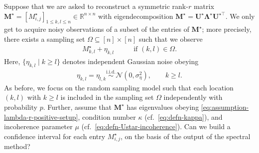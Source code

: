 Suppose that we are asked to reconstruct a symmetric rank-$r$ matrix
 $\bm{M}^{\star}=[M_{i,j}^{\star}]_{1\leq k,l \leq n}\in \mathbb{R}^{n\times n}$  
 with eigendecomposition $\bm{M}^{\star}=\bm{U}^{\star}\bm{\Lambda}^{\star}\bm{U}^{\star\top}$.
 We only get to acquire noisy observations of a subset of the entries of $\bm{M}^{\star}$; more precisely, 
there exists a sampling set $\Omega \subseteq [n]\times [n]$ such that we observe
%
\begin{align}
	M_{k,l}^{\star} + \eta_{k,l} \qquad & \text{if } (k,l)\in \Omega. 
\end{align}
%
Here, $\{\eta_{k,l}\mid k\geq l\}$ denotes independent Gaussian noise obeying  
%
\begin{align}
	\eta_{k,l} = \eta_{l,k} \overset{\mathrm{i.i.d.}}{\sim} \mathcal{N}(0, \sigma_{\eta}^2), \qquad k\geq l. 
\end{align}
%
As before, we focus on the random sampling model such that each location $(k,l)$ with $k\geq l$ is included in the sampling set $\Omega$ independently with probability $p$. Further,
 assume that $\bm{M}^{\star}$ has eigenvalues obeying \eqref{eq:assumption-lambda-r-positive-setup}, condition number $\kappa$ (cf.~\eqref{eq:defn-kappa}), and  incoherence parameter $\mu$ (cf.~\eqref{eq:defn-Ustar-incoherence}). 
Can we build a confidence interval for each entry $M_{i,j}^{\star}$, on the basis of the output of the spectral method?  






